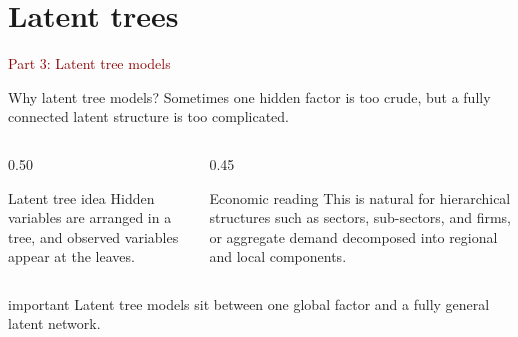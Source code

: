 \documentclass[dvipsnames,aspectratio=169,handout]{beamer}
\begin{document}

\section{Latent trees}

\begin{frame}{}
\begin{center}
{\Huge \textcolor{DarkRed}{Part 3: Latent tree models}}
\end{center}
\end{frame}

\begin{frame}{Why latent tree models?}
Sometimes one hidden factor is too crude, but a fully connected latent structure is too complicated.

\begin{columns}[T]
\begin{column}{0.50\textwidth}
\begin{block}{Latent tree idea}
Hidden variables are arranged in a tree, and observed variables appear at the leaves.
\end{block}
\end{column}
\begin{column}{0.45\textwidth}
\begin{block}{Economic reading}
This is natural for hierarchical structures such as sectors, sub-sectors, and firms, or aggregate demand decomposed into regional and local components.
\end{block}
\end{column}
\end{columns}

\begin{beamercolorbox}[wd=\textwidth,sep=7pt,center,rounded=true,shadow=true]{important}
Latent tree models sit between one global factor and a fully general latent network.
\end{beamercolorbox}
\end{frame}
\end{document}
